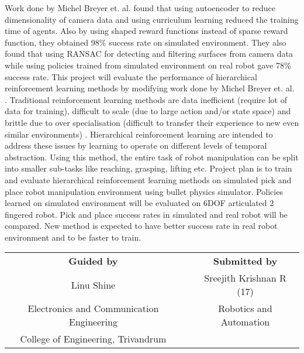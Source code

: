 \documentclass[11pt,a4paper]{article}
\begin{document}
Work done by Michel Breyer et. al. \cite{visual-robot-manipulation} found that using autoencoder to reduce dimensionality of camera data and using curriculum learning reduced the training time of agents. Also by using shaped reward functions instead of sparse reward function, they obtained 98\% success rate on simulated environment. They also found that using RANSAC for detecting and filtering surfaces from camera data while using policies trained from simulated environment on real robot gave 78\% success rate. This project will evaluate the performance of hierarchical reinforcement learning methods by modifying work done by Michel Breyer et. al. \cite{visual-robot-manipulation}. Traditional reinforcement learning methods are data inefficient (require lot of data for training), difficult to scale (due to large action and/or state space) and brittle due to over specialisation (difficult to transfer their experience to new even similar environments) \cite{thegradient}. Hierarchical reinforcement learning are intended to address these issues by learning to operate on different levels of temporal abstraction. Using this method, the entire task of robot manipulation can be split into smaller sub-tasks like reaching, grasping, lifting etc. Project plan is to train and evaluate hierarchical reinforcement learning methods on simulated pick and place robot manipulation environment using bullet physics simulator. Policies learned on simulated environment will be evaluated on 6DOF articulated 2 fingered robot. Pick and place success rates in simulated and real robot will be compared. New method is expected to have better success rate in real robot environment and to be faster to train.

\vspace{10mm}

\begin{tabularx}{\textwidth}{c X c}
\textbf{Guided by} & & \textbf{Submitted by} \\
Linu Shine & & Sreejith Krishnan R (17) \\
Electronics and Communication Engineering & & Robotics and Automation \\
College of Engineering, Trivandrum & & \\
\end{tabularx}
\end{document}
